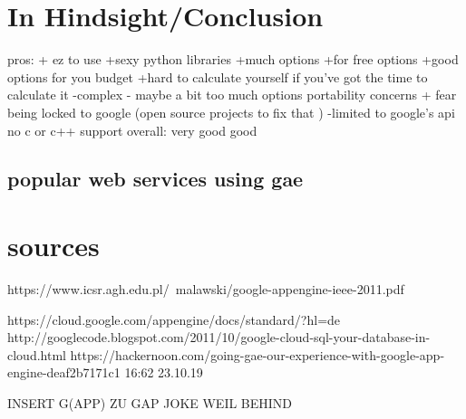 \documentclass{article}
\begin{document}
\section{In Hindsight/Conclusion}
pros: + ez to use
      +sexy python libraries
      +much options
      +for free options
      +good options for you budget 
      +hard to calculate yourself if you've got the time to calculate it
      -complex
      - maybe a bit too much options 
      portability concerns + fear being locked to google (open source projects to fix that )
      -limited to google's api
      no c or c++ support 
      overall: very good good
      \subsection{popular web services using gae} 
      
      
\section{sources}
https://www.icsr.agh.edu.pl/~malawski/google-appengine-ieee-2011.pdf

https://cloud.google.com/appengine/docs/standard/?hl=de
http://googlecode.blogspot.com/2011/10/google-cloud-sql-your-database-in-cloud.html
https://hackernoon.com/going-gae-our-experience-with-google-app-engine-deaf2b7171c1 16:62 23.10.19


INSERT G(APP) ZU GAP JOKE WEIL BEHIND
\end{document}
